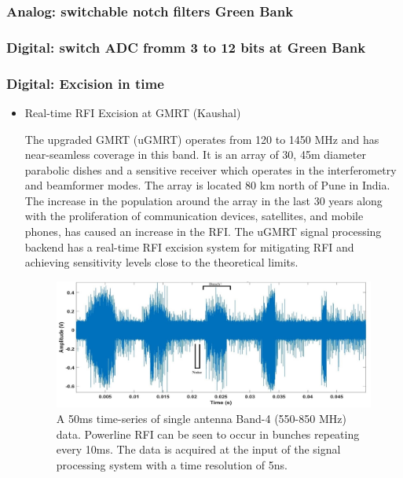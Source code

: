 \subsubsection{Analog: switchable notch filters Green Bank}
\subsubsection{Digital: switch ADC fromm 3 to 12 bits at Green Bank}

\subsubsection{Digital: Excision in time}

\begin{itemize}
\item Real-time RFI Excision at GMRT (Kaushal)

The upgraded GMRT (uGMRT) \cite{gupta2017upgraded} operates from 120 to 1450 MHz and has near-seamless coverage in this band. It is an array of 30, 45m diameter parabolic dishes and a sensitive receiver which operates in the interferometry and beamformer modes. The array is located 80 km north of Pune in India. The increase in the population around the array in the last 30 years along with the proliferation of communication devices, satellites, and mobile phones, has caused an increase in the RFI. The uGMRT signal processing backend has a real-time RFI excision system for mitigating RFI and achieving sensitivity levels close to the theoretical limits. \\

\begin{figure}
    \centering
    \includegraphics[scale=0.7]{Hardware Excision Techniques/figures/Band4_timeseries_ed.jpg}
    \caption{A 50ms time-series of single antenna Band-4 (550-850 MHz) data. Powerline RFI can be seen to occur in bunches repeating every 10ms. The data is acquired at the input of the signal processing system with a time resolution of 5ns.}
    \label{fig:ugmrt-b4-ts}
\end{figure}


\end{itemize}
